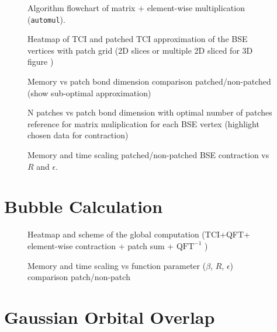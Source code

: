 \begin{figure}[ht!]
    \caption{Algorithm flowchart of matrix + element-wise multiplication\\(\texttt{automul}).}
\end{figure}

\begin{figure}[ht!]
    \caption{Heatmap of TCI and patched TCI approximation of the BSE vertices with patch grid (2D slices or multiple 2D sliced for 3D figure )}
\end{figure}

\begin{figure}[ht!]
    \caption{Memory vs patch bond dimension comparison patched/non-patched (show sub-optimal approximation)}
\end{figure}

\begin{figure}[ht!]
    \caption{N patches vs patch bond dimension with optimal number of patches reference for matrix muliplication for each BSE vertex (highlight chosen data for contraction)}
\end{figure}

\begin{figure}[ht!]
    \caption{Memory and time scaling patched/non-patched BSE contraction vs $R$ and $\epsilon$.}
\end{figure}

\section{Bubble Calculation}


\begin{figure}[ht!]
    \caption{Heatmap and scheme of the global computation (TCI+QFT+ element-wise contraction + patch sum + $\textrm{QFT}^{-1}$ )}
\end{figure}

\begin{figure}[ht!]
    \caption{Memory and time scaling vs function parameter ($\beta$, $R$, $\epsilon$) comparison patch/non-patch }
\end{figure}


\section{Gaussian Orbital Overlap}


